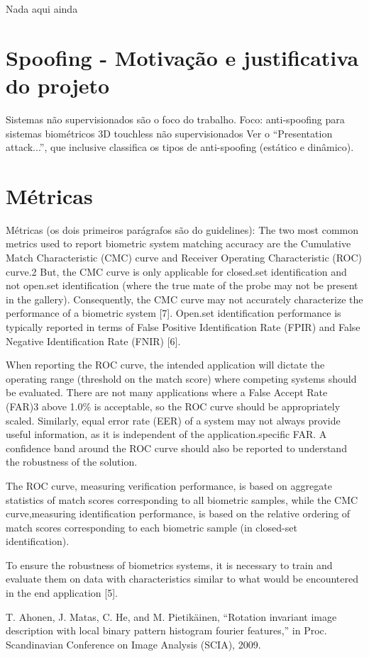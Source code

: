 Nada aqui ainda

\section{Spoofing - Motivação e justificativa do projeto} \label{spoofing}%
Sistemas não supervisionados são o foco do trabalho.
Foco: anti-spoofing para sistemas biométricos 3D touchless não supervisionados
Ver o ``Presentation attack...'', que inclusive classifica os tipos de anti-spoofing (estático e dinâmico).

\section{Métricas}%
Métricas (os dois primeiros parágrafos são do guidelines):
The two most common metrics used to report biometric system matching accuracy are the Cumulative Match Characteristic (CMC) curve and Receiver Operating Characteristic (ROC) curve.2 But, the CMC curve is only applicable for closed.set identification and not open.set identification (where the true mate of the probe may not be present in the gallery). Consequently, the CMC curve may not accurately characterize the performance of a biometric system [7]. Open.set identification performance is typically reported in terms of False Positive Identification Rate (FPIR) and False Negative Identification Rate (FNIR) [6].

When reporting the ROC curve, the intended application will dictate the operating range (threshold on the match score) where competing systems should be evaluated. There are not many applications where a False Accept Rate (FAR)3 above 1.0\% is acceptable, so the ROC curve should be appropriately scaled. Similarly, equal error rate (EER) of a system may not always provide useful information, as it is independent of the application.specific FAR. A confidence band around the ROC curve should also be reported to understand the robustness of the solution.

The ROC curve, measuring verification performance, is based on aggregate statistics of match scores corresponding to all biometric samples, while the CMC curve,measuring identification performance, is based on the relative ordering of match scores corresponding to each biometric sample (in closed-set identification).

To ensure the robustness of biometrics systems, it is necessary to train and evaluate them on data with characteristics similar to what would be encountered in the end application [5].

T. Ahonen, J. Matas, C. He, and M. Pietikäinen, “Rotation invariant
image description with local binary pattern histogram fourier features,” in
Proc. Scandinavian Conference on Image Analysis (SCIA), 2009.